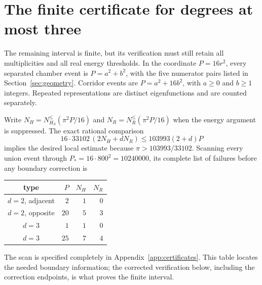 \documentclass[11pt,reqno]{amsart}
\numberwithin{equation}{section}
\begin{document}
\section{The finite certificate for degrees at most three}
\label{sec:finite-closure}

The remaining interval is finite, but its verification must still retain
all multiplicities and all real energy thresholds. In the coordinate
$P=16r^2$, every separated chamber event is $P=a^2+b^2$, with the five
numerator pairs listed in Section~\ref{sec:geometry}. Corridor events
are $P=a^2+16b^2$, with $a\ge0$ and $b\ge1$ integers. Repeated
representations are distinct eigenfunctions and are counted separately.

Write $N_H=N_{H_S}^{\le}(\pi^2P/16)$ and
$N_R=N_R^{\le}(\pi^2P/16)$ when the energy argument is suppressed.
The exact rational comparison
\begin{equation}
 16\cdot33102\,(2N_H+dN_R)
 \le103993(2+d)P
 \label{eq:compact-rational-test}
\end{equation}
implies the desired local estimate because $\pi>103993/33102$.
Scanning every union event through
$P_*=16\cdot800^2=10240000$, its complete list of failures before any
boundary correction is
\begin{center}
\begin{tabular}{c|r|r|r}
type & $P$ & $N_H$ & $N_R$\\ \hline
$d=2$, adjacent & $2$ & $1$ & $0$\\
$d=2$, opposite & $20$ & $5$ & $3$\\
$d=3$ & $1$ & $1$ & $0$\\
$d=3$ & $25$ & $7$ & $4$
\end{tabular}
\end{center}
The scan is specified completely in Appendix~\ref{app:certificates}.
This table locates the needed boundary information; the corrected
verification below, including the correction endpoints, is what proves
the finite interval.
\end{document}
